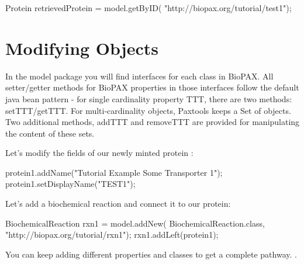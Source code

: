 \documentclass{tufte-book}
\begin{document}
\begin{javacode}
Protein retrievedProtein = model.getByID(
	"http://biopax.org/tutorial/test1"); 
\end{javacode}






\section{Modifying Objects}

In the model package you will find interfaces for each class in BioPAX. All setter/getter methods for BioPAX properties in those interfaces follow the default java bean pattern - for single cardinality property TTT, there are two methods: setTTT/getTTT. For  multi-cardinality objects, Paxtools keeps a Set of objects. Two additional methods, addTTT and removeTTT are provided for manipulating the content of these sets.

Let's modify the fields of our newly minted protein :

\begin{javacode}
protein1.addName("Tutorial Example Some Transporter 1");
protein1.setDisplayName("TEST1");
\end{javacode}

Let's add a biochemical reaction and connect it to our protein:


\begin{javacode}
BiochemicalReaction rxn1 = model.addNew(
	BiochemicalReaction.class,
         "http://biopax.org/tutorial/rxn1");
rxn1.addLeft(protein1);
\end{javacode}

You can keep adding different properties and classes to get a complete pathway. .
\end{document}
